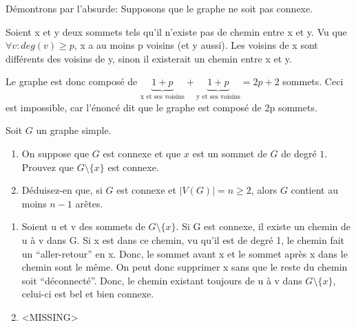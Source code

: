 Démontrons par l'absurde: Supposons que le graphe ne soit pas connexe.

Soient x et y deux sommets tels qu'il n'existe pas de chemin entre x et y. Vu que $\forall v: deg(v)\geq p$, x a au moins p voisins (et y aussi). Les voisins de x sont différents des voisins de y, sinon il existerait un chemin entre x et y.

Le graphe est donc composé de $\underbrace{1+p}_{\text{x et ses voisins}}+\underbrace{1+p}_{\text{y et ses voisins}} = 2p+2$ sommets. Ceci est impossible, car l'énoncé dit que le graphe est composé de 2p sommets.

\newpage


\begin{exo}
Soit $G$ un graphe simple.
\begin{enumerate}
\item On suppose que $G$ est connexe et que $x$ est un sommet de $G$ de degr\'e $1$. Prouvez que $G\setminus\{x\}$ est connexe.
\item D\'eduisez-en que, si $G$ est connexe et $|V(G)|=n\geq 2$, alors $G$ contient au moins $n-1$ ar\^etes.
\end{enumerate}
\end{exo}

\begin{enumerate}
\item Soient u et v des sommets de $G\setminus\{x\}$. Si G est connexe, il existe un chemin de u à v dans G. Si x est dans ce chemin, vu qu'il est de degré 1, le chemin fait un ``aller-retour'' en x. Donc, le sommet avant x et le sommet après x dans le chemin sont le même. On peut donc supprimer x sans que le reste du chemin soit ``déconnecté''. Donc, le chemin existant toujours de u à v dans $G\setminus\{x\}$, celui-ci est bel et bien connexe.
\item <MISSING>
\end{enumerate}


